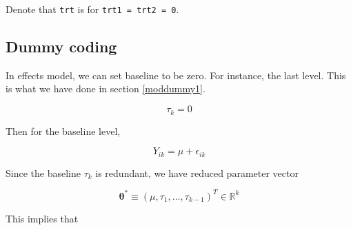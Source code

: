 \documentclass[]{book}
\theoremstyle{definition}
\theoremstyle{definition}
\theoremstyle{definition}
\theoremstyle{remark}
\begin{document}
Denote that \texttt{trt} is for \texttt{trt1\ =\ trt2\ =\ 0}.

\hypertarget{dummy-coding}{%
\subsection{Dummy coding}\label{dummy-coding}}

In effects model, we can set baseline to be zero. For instance, the last level. This is what we have done in section \ref{moddummy1}.

\[\tau_k = 0\]

Then for the baseline level,

\[Y_{ik} = \mu + \epsilon_{ik}\]

Since the baseline \(\tau_k\) is redundant, we have reduced parameter vector

\[\boldsymbol\theta^{\ast} \equiv (\mu, \tau_1, \ldots, \tau_{k - 1})^T \in \mathbb{R}^k\]

This implies that
\end{document}
